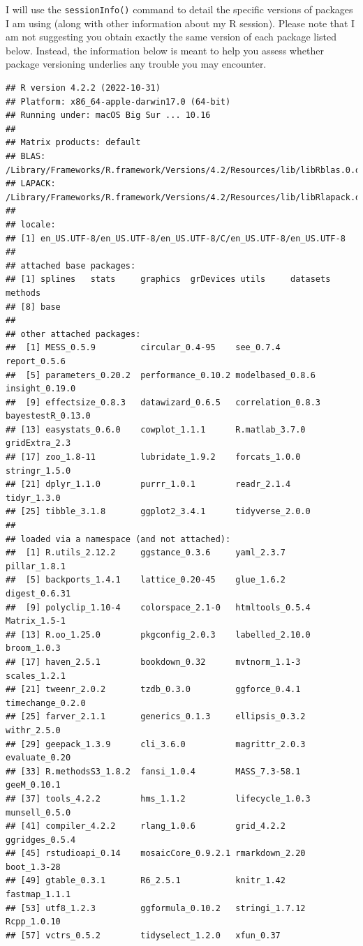 \documentclass[
]{book}
\begin{document}
I will use the \texttt{sessionInfo()} command to detail the specific versions of
packages I am using (along with other information about my R session). Please
note that I am not suggesting you obtain exactly the same version of each
package listed below. Instead, the information below is meant to help you assess
whether package versioning underlies any trouble you may encounter.

\begin{verbatim}
## R version 4.2.2 (2022-10-31)
## Platform: x86_64-apple-darwin17.0 (64-bit)
## Running under: macOS Big Sur ... 10.16
## 
## Matrix products: default
## BLAS:   /Library/Frameworks/R.framework/Versions/4.2/Resources/lib/libRblas.0.dylib
## LAPACK: /Library/Frameworks/R.framework/Versions/4.2/Resources/lib/libRlapack.dylib
## 
## locale:
## [1] en_US.UTF-8/en_US.UTF-8/en_US.UTF-8/C/en_US.UTF-8/en_US.UTF-8
## 
## attached base packages:
## [1] splines   stats     graphics  grDevices utils     datasets  methods  
## [8] base     
## 
## other attached packages:
##  [1] MESS_0.5.9         circular_0.4-95    see_0.7.4          report_0.5.6      
##  [5] parameters_0.20.2  performance_0.10.2 modelbased_0.8.6   insight_0.19.0    
##  [9] effectsize_0.8.3   datawizard_0.6.5   correlation_0.8.3  bayestestR_0.13.0 
## [13] easystats_0.6.0    cowplot_1.1.1      R.matlab_3.7.0     gridExtra_2.3     
## [17] zoo_1.8-11         lubridate_1.9.2    forcats_1.0.0      stringr_1.5.0     
## [21] dplyr_1.1.0        purrr_1.0.1        readr_2.1.4        tidyr_1.3.0       
## [25] tibble_3.1.8       ggplot2_3.4.1      tidyverse_2.0.0   
## 
## loaded via a namespace (and not attached):
##  [1] R.utils_2.12.2     ggstance_0.3.6     yaml_2.3.7         pillar_1.8.1      
##  [5] backports_1.4.1    lattice_0.20-45    glue_1.6.2         digest_0.6.31     
##  [9] polyclip_1.10-4    colorspace_2.1-0   htmltools_0.5.4    Matrix_1.5-1      
## [13] R.oo_1.25.0        pkgconfig_2.0.3    labelled_2.10.0    broom_1.0.3       
## [17] haven_2.5.1        bookdown_0.32      mvtnorm_1.1-3      scales_1.2.1      
## [21] tweenr_2.0.2       tzdb_0.3.0         ggforce_0.4.1      timechange_0.2.0  
## [25] farver_2.1.1       generics_0.1.3     ellipsis_0.3.2     withr_2.5.0       
## [29] geepack_1.3.9      cli_3.6.0          magrittr_2.0.3     evaluate_0.20     
## [33] R.methodsS3_1.8.2  fansi_1.0.4        MASS_7.3-58.1      geeM_0.10.1       
## [37] tools_4.2.2        hms_1.1.2          lifecycle_1.0.3    munsell_0.5.0     
## [41] compiler_4.2.2     rlang_1.0.6        grid_4.2.2         ggridges_0.5.4    
## [45] rstudioapi_0.14    mosaicCore_0.9.2.1 rmarkdown_2.20     boot_1.3-28       
## [49] gtable_0.3.1       R6_2.5.1           knitr_1.42         fastmap_1.1.1     
## [53] utf8_1.2.3         ggformula_0.10.2   stringi_1.7.12     Rcpp_1.0.10       
## [57] vctrs_0.5.2        tidyselect_1.2.0   xfun_0.37
\end{verbatim}
\end{document}

